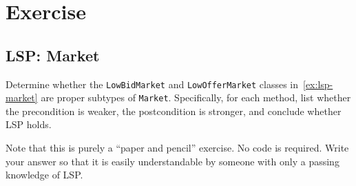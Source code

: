 \documentclass[oneside,11pt,dvipsnames]{book}
\newcommand{\code}[1]{\texttt{#1}}
\begin{document}
\section{Exercise}


\subsection{LSP: Market}\label{exercise:market}

Determine whether the \code{LowBidMarket} and \code{LowOfferMarket} classes in~\autoref{ex:lsp-market} are proper subtypes of \code{Market}. Specifically, for each method, list whether the precondition is weaker, the postcondition is stronger, and conclude whether LSP holds.

Note that this is purely a ``paper and pencil'' exercise. No code is required. Write your answer so that it is easily understandable by someone with only a passing knowledge of LSP.
\end{document}
